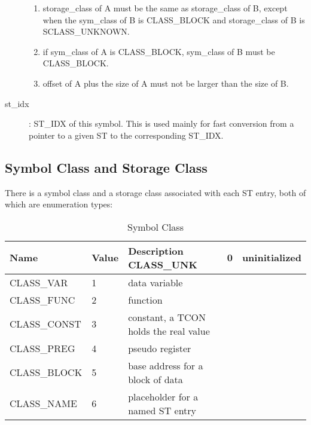 \begin{description}
\begin{enumerate}
\item storage\_class of A must be the same as
storage\_class of B, except when the sym\_class of B is
%
CLASS\_BLOCK and storage\_class of B is SCLASS\_UNKNOWN.


\item if sym\_class of A is CLASS\_BLOCK, sym\_class of B must be CLASS\_BLOCK.

\item offset of A plus the size of A must not be larger than the size of
B.
\end{enumerate}

\item[st\_idx]:
%
ST\_IDX of this symbol.
This is used mainly for fast conversion from a pointer to a given
%
ST to the corresponding ST\_IDX.
\end{description}

\subsection{Symbol Class and Storage Class}

There is a symbol class and a storage class associated with each
%
ST
entry, both of which are enumeration types:

\begin{center}
\begin{longtable}{|p{1in}|p{.5in}|p{2.75in}|}
\caption{Symbol Class\label{sym-class}}\\
\hline
Name & Value & Description \endhead\hline\hline
{}%
CLASS\_UNK & 0 & uninitialized \\\hline
{}%
CLASS\_VAR & 1 & data variable \\\hline
{}%
CLASS\_FUNC & 2 & function \\\hline
{}%
CLASS\_CONST & 3 & constant, a
%
TCON holds the real value \\\hline
{}%
CLASS\_PREG & 4 & pseudo register \\\hline
{}%
CLASS\_BLOCK & 5 & base address for a block of data \\\hline
{}%
CLASS\_NAME & 6 & placeholder for a named
%
ST entry\\\hline
\end{longtable}
\end{center}

